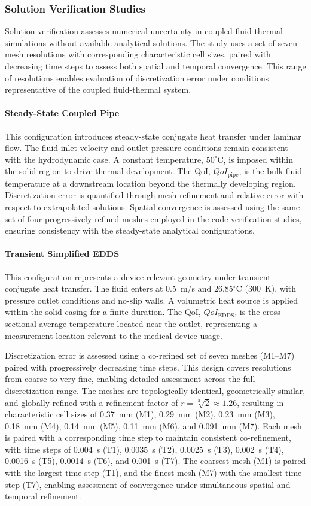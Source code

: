 \subsubsection{Solution Verification Studies}
Solution verification assesses numerical uncertainty in coupled fluid-thermal simulations without available analytical solutions. The study uses a set of seven mesh resolutions with corresponding characteristic cell sizes, paired with decreasing time steps to assess both spatial and temporal convergence. This range of resolutions enables evaluation of discretization error under conditions representative of the coupled fluid-thermal system.

\paragraph{Steady-State Coupled Pipe}
This configuration introduces steady-state conjugate heat transfer under laminar flow. The fluid inlet velocity and outlet pressure conditions remain consistent with the hydrodynamic case. A constant temperature, $50^{\circ} $C, is imposed within the solid region to drive thermal development. The QoI, $QoI_{\text{pipe}}$, is the bulk fluid temperature at a downstream location beyond the thermally developing region. Discretization error is quantified through mesh refinement and relative error with respect to extrapolated solutions. Spatial convergence is assessed using the same set of four progressively refined meshes employed in the code verification studies, ensuring consistency with the steady-state analytical configurations.

\paragraph{Transient Simplified EDDS}
This configuration represents a device-relevant geometry under transient conjugate heat transfer. The fluid enters at 0.5~m/s and 26.85$^\circ$C (300~K), with pressure outlet conditions and no-slip walls. A volumetric heat source is applied within the solid casing for a finite duration. The QoI, $QoI_{\text{EDDS}}$, is the cross-sectional average temperature located near the outlet, representing a measurement location relevant to the medical device usage.

Discretization error is assessed using a co-refined set of seven meshes (M1--M7) paired with progressively decreasing time steps. This design covers resolutions from coarse to very fine, enabling detailed assessment across the full discretization range. The meshes are topologically identical, geometrically similar, and globally refined with a refinement factor of $r = \sqrt[3]{2} \approx 1.26$, resulting in characteristic cell sizes of 0.37~mm (M1), 0.29~mm (M2), 0.23~mm (M3), 0.18~mm (M4), 0.14~mm (M5), 0.11~mm (M6), and 0.091~mm (M7). Each mesh is paired with a corresponding time step to maintain consistent co-refinement, with time steps of 0.004~s (T1), 0.0035~s (T2), 0.0025~s (T3), 0.002~s (T4), 0.0016~s (T5), 0.0014~s (T6), and 0.001~s (T7). The coarsest mesh (M1) is paired with the largest time step (T1), and the finest mesh (M7) with the smallest time step (T7), enabling assessment of convergence under simultaneous spatial and temporal refinement.

